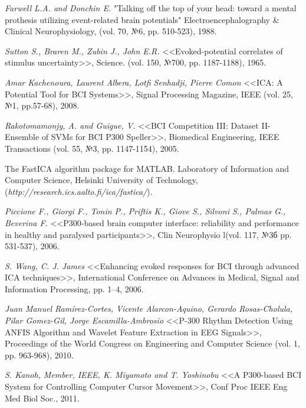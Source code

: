 \documentclass[12pt,fleqn]{article}
\begin{document}

\newpage

\renewcommand{\bibname}{Список литературы}
\addcontentsline{toc}{section}{\bibname}


\def\BibUrl#1.{}\def\BibAnnote#1.{}


\begin{thebibliography}{1}

{\it Farwell L.A. and Donchin E.}
\newblock "Talking off the top of your head: toward a mental prothesis utilizing event-related brain potentials"
\newblock Electroencephalography \& Clinical Neurophysiology, (vol. 70, №6, pp. 510-523), 1988.

{\it Sutton S., Braren M., Zubin J., John E.R.}
\newblock <<Evoked-potential correlates of stimulus uncertainty>>,
\newblock Science. (vol. 150, №700, pp. 1187-1188), 1965.

{\it Amar Kachenoura, Laurent Albera, Lotfi Senhadji, Pierre Comon}
\newblock <<ICA: A Potential Tool for BCI Systems>>,
\newblock Signal Processing Magazine, IEEE (vol. 25, №1, pp.57-68), 2008.

{\it Rakotomamonjy, A. and Guigue, V.}
\newblock <<BCI Competition III: Dataset II- Ensemble of SVMs for BCI P300 Speller>>,
\newblock Biomedical Engineering, IEEE Transactions (vol. 55, №3, pp. 1147-1154), 2005.

The FastICA algorithm package for MATLAB.
\newblock Laboratory of Information and Computer Science, Helsinki University of Technology,
\newblock ({\it http://research.ics.aalto.fi/ica/fastica/}).

{\it Piccione F., Giorgi F., Tonin P., Priftis K., Giove S., Silvoni S., Palmas G., Beverina F.}
\newblock  <<P300-based brain computer interface: reliability and performance in healthy and paralysed participants>>,
\newblock Clin Neurophysio l(vol. 117, №3б pp. 531-537), 2006.

{\it S. Wang, C. J. James}
\newblock <<Enhancing evoked responses for BCI through advanced ICA techniques>>,
\newblock International Conference on Advances in Medical, Signal and Information Processing, pp. 1--4, 2006.

{\it Juan Manuel Ramírez-Cortes, Vicente Alarcon-Aquino, Gerardo Rosas-Cholula, Pilar Gomez-Gil, Jorge Escamilla-Ambrosio} 
\newblock <<P-300 Rhythm Detection Using ANFIS Algorithm and Wavelet Feature Extraction in EEG Signals>>,
\newblock Proceedings of the World Congress on Engineering and Computer Science (vol. 1,  pp. 963-968), 2010.

{\it S. Kanoh, Member, IEEE, K. Miyamoto and T. Yoshinobu}
\newblock <<A P300-based BCI System for Controlling Computer Cursor Movement>>,
\newblock Conf Proc IEEE Eng Med Biol Soc., 2011.
\end{thebibliography}
\end{document}
